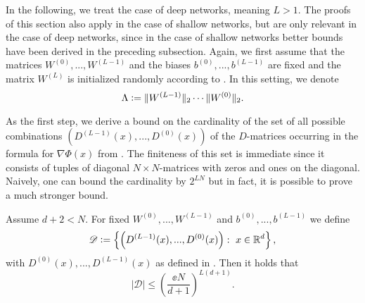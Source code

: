 \newcommand{\D}{\mathscr{D}}
\label{sec:deep}
In the following, we treat the case of deep networks, meaning $L > 1$. The proofs of this section also apply in the case of shallow networks, but are only relevant in the case of deep networks, since in the case of shallow networks better bounds have been derived in the preceding subsection. Again, we first assume that the matrices $W^{(0)}, ..., W^{(L-1)}$ and the biases $b^{(0)}, ..., b^{(L-1)}$ are fixed and the matrix $W^{(L)}$ is initialized randomly according to . In this setting, we denote
\begin{equation*}
\Lambda \mathrel{\mathop:}= \Vert W^{(L-1)} \Vert_2 \cdots \Vert W^{(0)} \Vert_2.
\end{equation*}

As the first step, we derive a bound on the cardinality of the set of all possible combinations $(D^{(L-1)}(x), ..., D^{(0)}(x))$ of the $D$-matrices occurring in the formula for $\nabla \Phi(x)$ from . The finiteness of this set is immediate since it consists of tuples of diagonal $N \times N$-matrices with zeros and ones on the diagonal. Naively, one can bound the cardinality by $2^{LN}$ but in fact, it is possible to prove a much stronger bound. 
\begin{lemma}\label{lem:D_card}
Assume $d+2 <N$. For fixed $W^{(0)},..., W^{(L-1)}$ and $b^{(0)}, ..., b^{(L-1)}$ we define
\begin{equation*}
\mathscr{D} \mathrel{\mathop:}= \left\{ \left(D^{(L-1)}(x),..., D^{(0)}(x)\right): \ x \in \mathbb{R}^d\right\},
\end{equation*}
with $D^{(0)}(x),..., D^{(L-1)}(x)$ as defined in .
Then it holds that
\begin{equation*}
\vert \mathscr{D} \vert \leq \left(\frac{\ee N}{d+1}\right)^{L(d+1)}.
\end{equation*}
\end{lemma}
